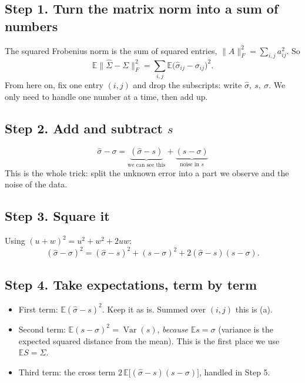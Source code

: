 \documentclass[12pt]{article}
\begin{document}
\subsection*{Step 1. Turn the matrix norm into a sum of numbers}
The squared Frobenius norm is the sum of squared entries, $\|A\|_F^2=\sum_{i,j}a_{ij}^2$. So
\[
\mathbb{E}\|\hat\Sigma-\Sigma\|_F^2=\sum_{i,j}\mathbb{E}\big(\hat\sigma_{ij}-\sigma_{ij}\big)^2 .
\]
From here on, fix one entry $(i,j)$ and drop the subscripts: write $\hat\sigma,\ s,\ \sigma$. We only
need to handle one number at a time, then add up.

\subsection*{Step 2. Add and subtract $s$}
\[
\hat\sigma-\sigma=\underbrace{(\hat\sigma-s)}_{\text{we can see this}}+\underbrace{(s-\sigma)}_{\text{noise in }s}
\]
This is the whole trick: split the unknown error into a part we observe and the noise of the data.

\subsection*{Step 3. Square it}
Using $(u+w)^2=u^2+w^2+2uw$:
\[
(\hat\sigma-\sigma)^2=(\hat\sigma-s)^2+(s-\sigma)^2+2(\hat\sigma-s)(s-\sigma).
\]

\subsection*{Step 4. Take expectations, term by term}
\begin{itemize}
\item First term: $\mathbb{E}(\hat\sigma-s)^2$. Keep it as is. Summed over $(i,j)$ this is (a).
\item Second term: $\mathbb{E}(s-\sigma)^2=\operatorname{Var}(s)$, \emph{because} $\mathbb{E}s=\sigma$ (variance is the
expected squared distance from the mean). This is the first place we use $\mathbb{E}S=\Sigma$.
\item Third term: the cross term $2\,\mathbb{E}\big[(\hat\sigma-s)(s-\sigma)\big]$, handled in Step 5.
\end{itemize}
\end{document}
